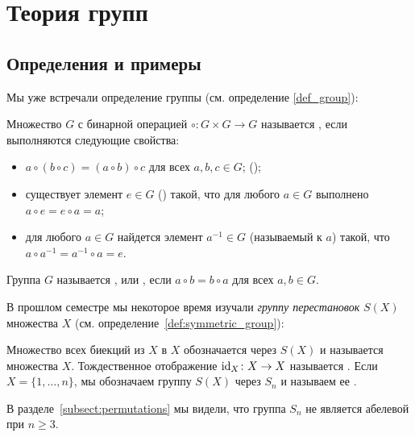 \section{Теория групп}

\subsection{Определения и примеры}


Мы уже встречали определение группы (см. определение \ref{def_group}):
\begin{definition}\label{def_group_new}
Множество $G$ с бинарной операцией $\circ\colon G\times G\to G$
называется
, если выполняются следующие свойства:
\begin{itemize}
\item $a\circ (b\circ c)=(a\circ b)\circ c$ для всех $a,b,c\in G$;
  ();
\item существует элемент $e\in G$ () такой, что
  для любого $a\in G$
  выполнено $a\circ e=e\circ a=a$;
\item для любого $a\in G$ найдется элемент $a^{-1}\in G$ (называемый
   к $a$) такой, что
  $a\circ a^{-1}=a^{-1}\circ a=e$.
\end{itemize}
Группа $G$ называется , или
, если
$a\circ b=b\circ a$ для всех $a,b\in G$.
\end{definition}

В прошлом семестре мы некоторое время изучали {\em группу
  перестановок} $S(X)$ множества $X$
(см. определение~\ref{def:symmetric_group}):
\begin{definition}\label{def:symmetric_group_new}
Множество всех биекций из $X$ в $X$ обозначается через $S(X)$ и
называется 
множества $X$. Тождественное
отображение $\operatorname{id}_X\colon X\to X$ называется .
Если $X=\{1,\dots,n\}$, мы обозначаем группу $S(X)$ через $S_n$ и
называем ее .
\end{definition}
В разделе~\ref{subsect:permutations} мы видели, что группа $S_n$
не является абелевой при $n\geq 3$.

